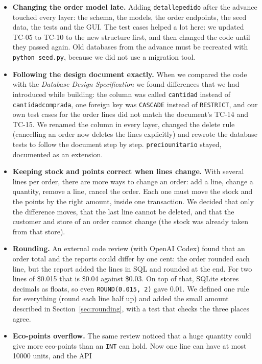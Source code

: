 \documentclass[11pt]{article}
\renewcommand{\_}{\oldus\allowbreak}
\begin{document}
\begin{itemize}[itemsep=0.3em]
  \item \textbf{Changing the order model late.} Adding \texttt{detalle\_pedido} after the advance
  touched every layer: the schema, the models, the order endpoints, the seed data, the tests and
  the GUI. The test cases helped a lot here: we updated TC-05 to TC-10 to the new structure first,
  and then changed the code until they passed again. Old databases from the advance must be
  recreated with \texttt{python seed.py}, because we did not use a migration tool.
  \item \textbf{Following the design document exactly.} When we compared the code with the
  \emph{Database Design Specification} we found differences that we had introduced while building:
  the column was called \texttt{cantidad} instead of \texttt{cantidad\_comprada}, one foreign key
  was \texttt{CASCADE} instead of \texttt{RESTRICT}, and our own test cases for the order lines did not
  match the document's TC-14 and TC-15. We renamed the column in every layer, changed the delete
  rule (cancelling an order now deletes the lines explicitly) and rewrote the database tests to follow
  the document step by step. \texttt{precio\_unitario} stayed, documented as an extension.
  \item \textbf{Keeping stock and points correct when lines change.} With several lines per order,
  there are more ways to change an order: add a line, change a quantity, remove a line, cancel the
  order. Each one must move the stock and the points by the right amount, inside one transaction.
  We decided that only the difference moves, that the last line cannot be deleted, and that the
  customer and store of an order cannot change (the stock was already taken from that store).
  \item \textbf{Rounding.} An external code review (with OpenAI Codex) found that an order total
  and the reports could differ by one cent: the order rounded each line, but the report added the
  lines in SQL and rounded at the end. For two lines of \$0.015 that is \$0.04 against \$0.03. On top
  of that, SQLite stores decimals as floats, so even \texttt{ROUND(0.015, 2)} gave 0.01. We defined
  one rule for everything (round each line half up) and added the small amount described in
  Section~\ref{sec:rounding}, with a test that checks the three places agree.
  \item \textbf{Eco-points overflow.} The same review noticed that a huge quantity could give more
  eco-points than an \texttt{INT} can hold. Now one line can have at most 10000 units, and the API

\end{itemize}
\end{document}
